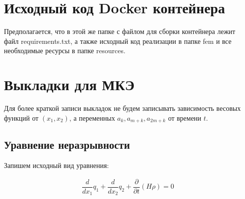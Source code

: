 \documentclass[14pt]{extreport}
\begin{document}


\newpage





\chapter{Исходный код Docker контейнера}

Предполагается, что в этой же папке с файлом для сборки контейнера лежит файл requirements.txt, а также исходный код реализации в папке fem и все необходимые ресурсы в папке resources.

\begin{minipage}{\linewidth}

\end{minipage}

\begin{minipage}{\linewidth}

\end{minipage}
 
\chapter{Выкладки для МКЭ}

 Для более краткой записи выкладок не будем записывать зависимость весовых функций от $(x_1, x_2)$, а переменных $a_k, a_{m+k}, a_{2m+k}$ от времени $t$.

\section{Уравнение неразрывности}

Запишем исходный вид уравнения:

\begin{eqnarray}
\dfrac{d}{d x_{1}} q_{1} + \dfrac{d}{d x_{2}} q_{2} + \dfrac{\partial}{\partial t}\left(H \rho\right) = 0
\end{eqnarray}
\end{document}
